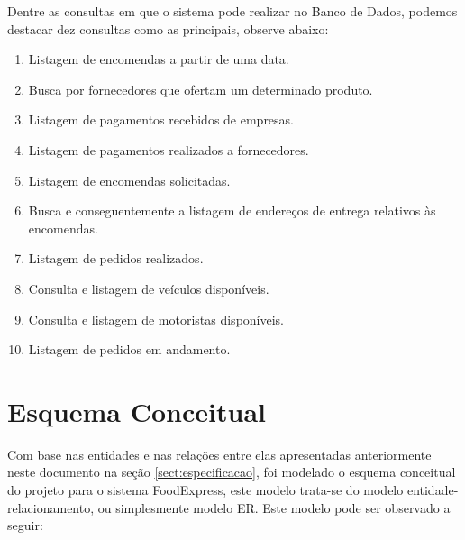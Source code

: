 \documentclass[12pt, onecolumn, titlepage]{article}
\begin{document}
Dentre as consultas em que o sistema pode realizar no Banco de Dados, podemos destacar dez consultas como as principais, observe abaixo:

\begin{enumerate}

\item Listagem de encomendas a partir de uma data.

\item Busca por fornecedores que ofertam um determinado produto.

\item Listagem de pagamentos recebidos de empresas.

\item Listagem de pagamentos realizados a fornecedores.

\item Listagem de encomendas solicitadas.

\item Busca e conseguentemente a listagem de endereços de entrega relativos às encomendas.

\item Listagem de pedidos realizados.

\item Consulta e listagem de veículos disponíveis.

\item Consulta e listagem de motoristas disponíveis.

\item Listagem de pedidos em andamento.


\end{enumerate}

\newpage
\section{Esquema Conceitual}
\label{sect:conceitual}

Com base nas entidades e nas relações entre elas apresentadas anteriormente neste documento na seção \ref{sect:especificacao}, foi modelado o esquema conceitual do projeto para o sistema FoodExpress, este modelo trata-se do modelo entidade-relacionamento, ou simplesmente modelo ER. Este modelo pode ser observado a seguir:
\end{document}
